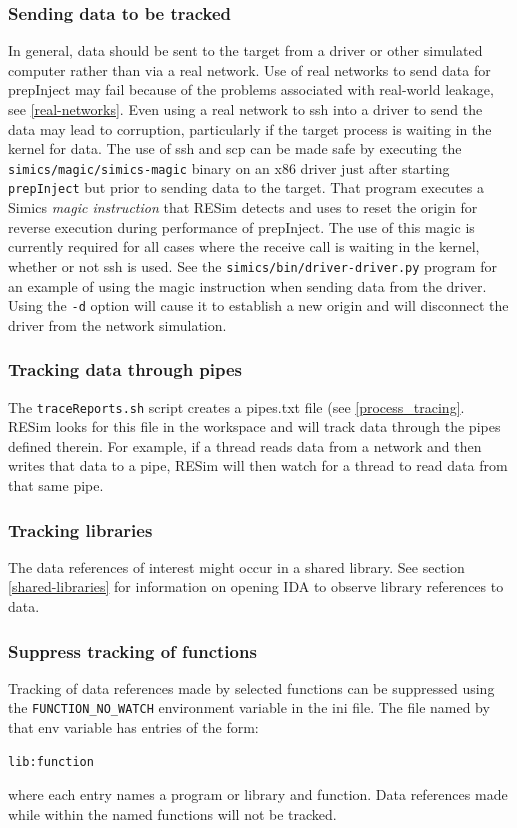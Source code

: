 \documentclass[titlepage]{article}
\begin{document}
\subsubsection{Sending data to be tracked}
In general, data should be sent to the target from a driver or other simulated computer rather than via a real network.  Use of real networks to
send data for prepInject may fail because of the problems associated with real-world leakage, see \ref{real-networks}.
Even using a real network to ssh into a driver to send the data may lead to corruption, particularly if the target process is waiting in the 
kernel for data.  The use of ssh and scp can be made safe by executing the {\tt simics/magic/simics-magic} binary on an x86 driver just after
starting {\tt prepInject} but prior to sending data to the target.  That program executes a Simics \textit{magic instruction} that RESim 
detects and uses to reset the origin for reverse execution during performance of prepInject.  The use of this magic is currently required for all
cases where the receive call is waiting in the kernel, whether or not ssh is used.  See the {\tt simics/bin/driver-driver.py} program for an example
of using the magic instruction when sending data from the driver.  Using the {\tt -d} option will cause it to establish a new origin and will disconnect
the driver from the network simulation.

\subsubsection{Tracking data through pipes}
The {\tt traceReports.sh} script creates a pipes.txt file (see \ref{process_tracing}.   RESim looks for this file in the workspace and will track data through the
pipes defined therein.  For example, if a thread reads data from a network and then writes that data to a pipe, RESim will then watch for a thread
to read data from that same pipe.

\subsubsection{Tracking libraries}
The data references of interest might occur in a shared library.  See section \ref{shared-libraries} for information on opening IDA to 
observe library references to data.

\subsubsection{Suppress tracking of functions}
\label{function_no_watch}
Tracking of data references made by selected functions can be suppressed using the {\tt FUNCTION\_NO\_WATCH} environment variable in the ini file.
The file named by that env variable has entries of the form:
\begin{verbatim}
lib:function
\end{verbatim}
\noindent where each entry names a program or library and function.  Data references made while within the named functions will not be tracked.
\end{document}
